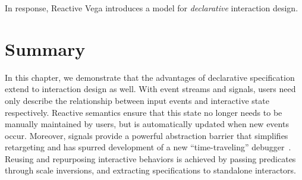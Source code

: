 In response, Reactive Vega introduces a model for \emph{declarative} interaction
design.

\vspace{-20pt}





\vspace{-10pt}

\section{Summary}
\label{sec:vg:lang-summary}

\vspace{-10pt}

In this chapter, we demonstrate that the advantages of declarative specification
extend to interaction design as well. With event streams and signals, users need
only describe the relationship between input events and interactive state
respectively. Reactive semantics ensure that this state no longer needs to be
manually maintained by users, but is automatically updated when new events
occur. Moreover, signals provide a powerful abstraction barrier that simplifies
retargeting and has spurred development of a new ``time-traveling''
debugger~\cite{hoffswell:debugging}. Reusing and repurposing interactive
behaviors is achieved by passing predicates through scale inversions, and
extracting specifications to standalone interactors.
